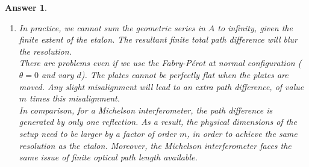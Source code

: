 \documentclass[a4paper]{article}
\newtheorem{ans}{Answer}[subsection]
\theoremstyle{new}
\begin{document}
\begin{ans}
\begin{enumerate}[label=(\roman*)]
$$\frac{1}{2}\frac{(1-R)^2}{1+R^2-2R}=\frac{(1-R)^2}{1+R^2-2R\cos\delta}\implies (1-R)^2=2R(1-\cos\delta)$$
where $\delta$ is the phase of the $m$th order of the line of $\lambda_0+\delta\lambda=633$ nm relative to that corresponding to the $m$th order maximum of the line at $\lambda_0=632$ nm. Hence,
$$2\mu k_0\cos\theta=2m\pi\implies\delta=2\mu k\cos\theta=2m\pi\frac{\lambda_0}{\lambda}\implies\cos\delta\sim 0.3$$
which gives $R^2-1+2R(1-0.3)=0\implies R=0.5$.
\item In practice, we cannot sum the geometric series in $A$ to infinity, given the finite extent of the etalon. The resultant finite total path difference will blur the resolution.\\[5pt]
There are problems even if we use the Fabry-Pérot at normal configuration ($\theta=0$ and vary $d$). The plates cannot be perfectly flat when the plates are moved. Any slight misalignment will lead to an extra path difference, of value $m$ times this misalignment.\\[5pt]
In comparison, for a Michelson interferometer, the path difference is generated by only one reflection. As a result, the physical dimensions of the setup need to be larger by a factor of order $m$, in order to achieve the same resolution as the etalon. Moreover, the Michelson interferometer faces the same issue of finite optical path length available.
\end{enumerate}
\end{ans}
\newpage
\end{document}
